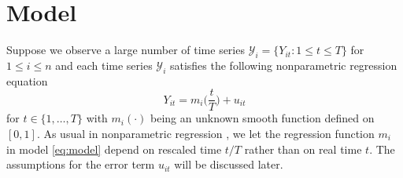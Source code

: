 \documentclass[a4paper,11pt]{article}
\numberwithin{equation}{section}
\begin{document}








\renewcommand{\baselinestretch}{1.5}\normalsize



\section{Model}

Suppose we observe a large number of time series $\mathcal{Y}_i = \{Y_{it}: 1 \leq t \leq T\}$ for $1 \leq i \leq n$ and each time series $\mathcal{Y}_i$ satisfies the following nonparametric regression equation
\begin{equation}\label{eq:model}
Y_{it} = m_i\Big(\frac{t}{T}\Big) + u_{it}
\end{equation}
for $t \in \{1, \ldots, T\}$ with $m_i(\cdot)$ being an unknown smooth function defined on $[0, 1]$. As usual in nonparametric regression \citep[see e.g.][]{Robinson1989}, we let the regression function $m_i$ in model \eqref{eq:model} depend on rescaled time $t/T$ rather than on real time $t$. The assumptions for the error term $u_{it}$ will be discussed later.
\end{document}
